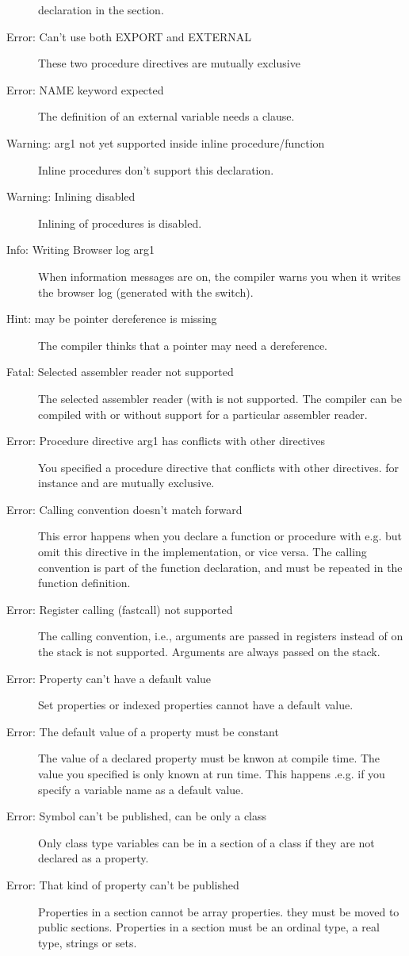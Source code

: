 \begin{description}
 declaration in the  section.
\item [Error: Can't use both EXPORT and EXTERNAL]
 These two procedure directives are mutually exclusive
\item [Error: NAME keyword expected]
 The definition of an external variable needs a  clause.
\item [Warning: arg1 not yet supported inside inline procedure/function]
 Inline procedures don't support this declaration.
\item [Warning: Inlining disabled]
 Inlining of procedures is disabled.
\item [Info: Writing Browser log arg1]
 When information messages are on, the compiler warns you when it
 writes the browser log (generated with the  switch).
\item [Hint: may be pointer dereference is missing]
 The compiler thinks that a pointer may need a dereference.
\item [Fatal: Selected assembler reader not supported]
 The selected assembler reader (with  is not
 supported. The compiler can be compiled with or without support for a
 particular assembler reader.
\item [Error: Procedure directive arg1 has conflicts with other directives]
 You specified a procedure directive that conflicts with other directives.
 for instance  and  are mutually exclusive.
\item [Error: Calling convention doesn't match forward]
 This error happens when you declare a function or procedure with 
 e.g.  but omit this directive in the implementation, or vice 
 versa. The calling convention is part of the function declaration, and
 must be repeated in the function definition.
\item [Error: Register calling (fastcall) not supported]
 The  calling convention, i.e., arguments are passed in
 registers instead of on the stack is not supported. Arguments are always
 passed on the stack.
\item [Error: Property can't have a default value]
 Set properties or indexed properties cannot have a default value.
\item [Error: The default value of a property must be constant]
 The value of a  declared property must be knwon at compile
 time. The value you specified is only known at run time. This happens
 .e.g. if you specify a variable name as a default value.
\item [Error: Symbol can't be published, can be only a class]
 Only class type variables can be in a  section of a class 
 if they are not declared as a property.
\item [Error: That kind of property can't be published]
 Properties in a  section cannot be array properties.
 they must be moved to public sections. Properties in a 
 section must be an ordinal type, a real type, strings or sets.
 \end{description}
